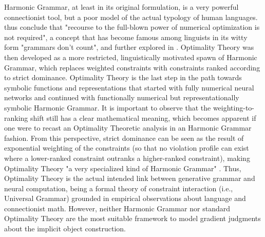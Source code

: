 Harmonic Grammar, at least in its original formulation, is a very powerful connectionist tool, but a poor model of the actual typology of human languages. \textcite[216]{princesmolensky1993optimality} thus conclude that "recourse to the full-blown power of numerical optimization is not required", a concept that has become famous among linguists in its witty form "grammars don't count", and further explored in \textcite{smolensky2006harmony}. Optimality Theory was then developed as a more restricted, linguistically motivated spawn of Harmonic Grammar, which replaces weighted constraints with constraints ranked according to strict dominance. Optimality Theory is the last step in the path towards symbolic functions and representations that started with fully numerical neural networks and continued with functionally numerical but representationally symbolic Harmonic Grammar. It is important to observe that the weighting-to-ranking shift still has a clear mathematical meaning, which becomes apparent if one were to recast an Optimality Theoretic analysis in an Harmonic Grammar fashion. From this perspective, strict dominance can be seen as the result of exponential weighting of the constraints (so that no violation profile can exist where a lower-ranked constraint outranks a higher-ranked constraint), making Optimality Theory "a very specialized kind of Harmonic Grammar" \parencite{princesmolensky1993optimality, PrinceSmolensky2008}. Thus, Optimality Theory is the actual intended link between generative grammar and neural computation, being a formal theory of constraint interaction (i.e., Universal Grammar) grounded in empirical observations about language and connectionist math. However, neither Harmonic Grammar nor standard Optimality Theory are the most suitable framework to model gradient judgments about the implicit object construction.


